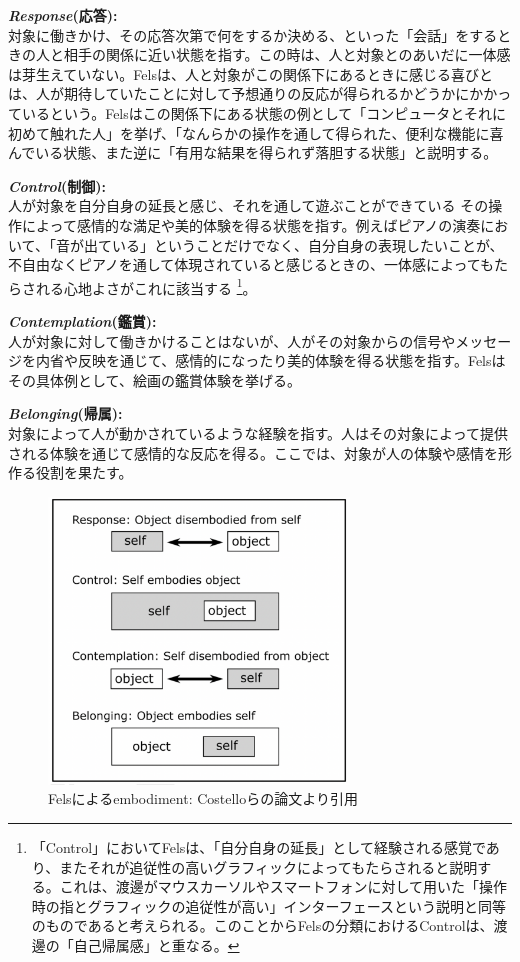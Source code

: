\textbf{\textit{Response}(応答):}\\
対象に働きかけ、その応答次第で何をするか決める、といった「会話」をするときの人と相手の関係に近い状態を指す。この時は、人と対象とのあいだに一体感は芽生えていない。Felsは、人と対象がこの関係下にあるときに感じる喜びとは、人が期待していたことに対して予想通りの反応が得られるかどうかにかかっているという。Felsはこの関係下にある状態の例として「コンピュータとそれに初めて触れた人」を挙げ、「なんらかの操作を通して得られた、便利な機能に喜んでいる状態、また逆に「有用な結果を得られず落胆する状態」と説明する。

\textbf{\textit{Control}(制御):}\\
人が対象を自分自身の延長と感じ、それを通して遊ぶことができている
その操作によって感情的な満足や美的体験を得る状態を指す。例えばピアノの演奏において、「音が出ている」ということだけでなく、自分自身の表現したいことが、不自由なくピアノを通して体現されていると感じるときの、一体感によってもたらされる心地よさがこれに該当する \footnote{「Control」においてFelsは、「自分自身の延長」として経験される感覚であり、またそれが追従性の高いグラフィックによってもたらされると説明する。これは、渡邊がマウスカーソルやスマートフォンに対して用いた「操作時の指とグラフィックの追従性が高い」インターフェースという説明と同等のものであると考えられる。このことからFelsの分類におけるControlは、渡邊の「自己帰属感」と重なる。}。

\textbf{\textit{Contemplation}(鑑賞):}\\
人が対象に対して働きかけることはないが、人がその対象からの信号やメッセージを内省や反映を通じて、感情的になったり美的体験を得る状態を指す。Felsはその具体例として、絵画の鑑賞体験を挙げる。

\textbf{\textit{Belonging}(帰属):}\\
対象によって人が動かされているような経験を指す。人はその対象によって提供される体験を通じて感情的な反応を得る。ここでは、対象が人の体験や感情を形作る役割を果たす。

\begin{figure}[H]
  \centering
  \includegraphics[width=8cm]{img/fels_diagram.png}
  \caption{Felsによるembodiment: Costelloらの論文より引用}
  \label{fig:fels_embodiment}
\end{figure}

